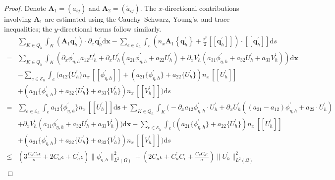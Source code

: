 \documentclass[pdflatex,sn-mathphys-num]{sn-jnl}%
\theoremstyle{thmstyleone}%
\theoremstyle{thmstyletwo}%
\theoremstyle{thmstylethree}%
\begin{document}
\begin{proof}
Denote $\mathbf{A}_1=(a_{ij})$ and $\mathbf{A}_2=(\tilde{a}_{ij})$. The $x$-directional contributions involving $\mathbf{A}_1$ are estimated using the Cauchy--Schwarz, Young’s, and trace inequalities; the $y$-directional terms follow similarly.
\begin{equation*}
\begin{aligned}
&\sum_{K \in Q_h} \int_K  (\mathbf{A}_{1} \mathbf{q}_h^{\prime}) \cdot \partial_x \mathbf{q}_h^{\prime} \mathrm{d} \mathbf{x}  -\sum_{e \in \mathcal{E}_h} \int_e  \left( n_x \mathbf{A}_{1}\left\{\mathbf{q}_h^{\prime}\right\} + \frac{\tau^*}{2} [[\mathbf{q}_h^{\prime}]]\right) \cdot [[\mathbf{q}_h^{\prime}]]  \mathrm{d} s\\
=&\sum_{K \in Q_h} \int_K \left(\partial_x \phi_{\eta,h}^{\prime} a_{12} U_h^{\prime} +  \partial_x U_h^{\prime} \left( a_{21} \phi_{\eta,h}^{\prime} + a_{22} U_h^{\prime}\right)  + \partial_x V_h^{\prime} \left( a_{31} \phi_{\eta,h}^{\prime} + a_{32} U_h^{\prime} + a_{33} V_h^{\prime}\right) \right) \mathrm{d} \mathbf{x} \\
&- \sum_{e \in \mathcal{E}_h} \int_e \bigg( a_{12} \{U_h^{\prime}\}n_x \, [[\phi_{\eta,h}^{\prime}]] + \left(  a_{21}\{\phi_{\eta,h}^{\prime}\} + a_{22}\{U_h^{\prime}\} \right)n_x \, [[U_{h}^{\prime}]] \\
&+ \left(  a_{31}\{\phi_{\eta,h}^{\prime}\} + a_{32}\{U_h^{\prime}\} + a_{33}\{V_h^{\prime}\} \right) n_x \, [[V_{h}^{\prime}]] \bigg)\mathrm{d} s  \\
=&\sum_{e \in \mathcal{E}_h} \int_e a_{12} \{\phi_{\eta,h}^{\prime}\}n_x \, [[U_h^{\prime}]] \mathrm{d} \mathbf{s} + \sum_{K \in Q_h} \int_K  \bigg( - \partial_x a_{12} \phi_{\eta,h}^{\prime} \cdot U^{\prime}_h + \partial_x U_h^{\prime} \left((a_{21}-a_{12})\phi_{\eta,h}^{\prime} + a_{22}\cdot U_h^{\prime} \right) \\
&+ \partial_x V_h^{\prime} \left( a_{31} \phi_{\eta,h}^{\prime} + a_{32} U_h^{\prime} + a_{33} V_h^{\prime}\right) \bigg) \mathrm{d} \mathbf{x} - \sum_{e \in \mathcal{E}_h} \int_e \bigg( \left(  a_{21}\{\phi_{\eta,h}^{\prime}\} + a_{22}\{U_h^{\prime}\} \right)n_x \, [[U_{h}^{\prime}]]  \\
&+ \left(  a_{31}\{\phi_{\eta,h}^{\prime}\} + a_{32}\{U_h^{\prime}\} + a_{33}\{V_h^{\prime}\} \right)n_x \, [[V_{h}^{\prime}]] \bigg)\mathrm{d} s \\
\le&
\left( 3\frac{C_kC_a \epsilon}{\sigma}+2C_a \epsilon + C_a^{\prime} \epsilon\right) \|\phi_{\eta,h}^{\prime}\|_{L^2(\Omega)}^2
+ \left(  2C_a \epsilon + C_a^{\prime}C_{\epsilon} + \frac{C_k C_a\epsilon}{\sigma} \right) \|U_{h}^{\prime}\|_{L^2(\Omega)}^2  \\

\end{aligned}
\end{equation*}
\end{proof}
\end{document}
